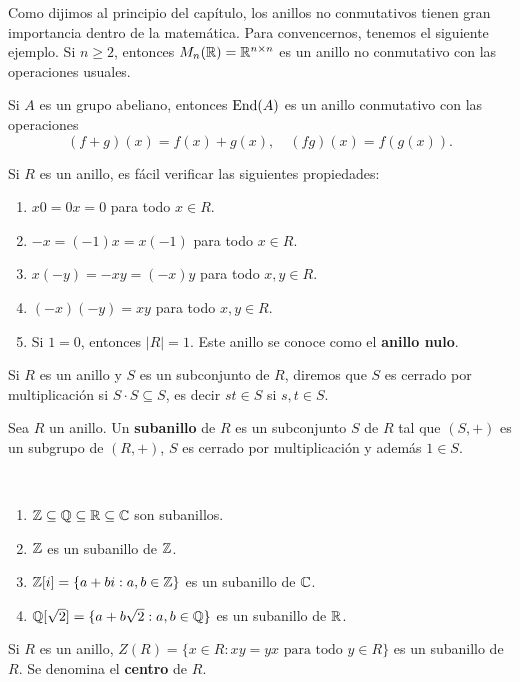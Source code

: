Como dijimos al principio del capítulo, los anillos no conmutativos tienen gran importancia dentro de la matemática. Para convencernos, 
tenemos el siguiente ejemplo. Si $n\geq2$, entonces 
$M_n(\mathbb{R})=\mathbb{R}^{n\times n}$ es un anillo no conmutativo con las operaciones usuales. 

\begin{exercise}
Si $A$ es un grupo abeliano, entonces $\operatorname{End}(A)$ es un anillo conmutativo con 
las operaciones
\[
(f+g)(x)=f(x)+g(x),\quad
(fg)(x)=f(g(x)).
\]	
\end{exercise}

Si $R$ es un anillo, es fácil verificar las siguientes propiedades:
\begin{enumerate}
	\item $x0=0x=0$ para todo $x\in R$.
	\item $-x=(-1)x=x(-1)$ para todo $x\in R$.
	\item $x(-y)=-xy=(-x)y$ para todo $x,y\in R$.
	\item $(-x)(-y)=xy$ para todo $x,y\in R$.
	\item Si $1=0$, entonces $|R|=1$. Este anillo se conoce como el \textbf{anillo nulo}.
\end{enumerate}

Si $R$ es un anillo y $S$ es un subconjunto de $R$, diremos que 
$S$ es cerrado por multiplicación si $S\cdot S\subseteq S$, 
es decir $st\in S$ si $s,t\in S$. 

\begin{definition}
Sea $R$ un anillo. 
Un \textbf{subanillo} de $R$ es un subconjunto $S$ de $R$ tal que $(S,+)$ es un subgrupo de $(R,+)$, $S$ es cerrado por multiplicación y además $1\in S$. 
\end{definition}

\begin{examples}\
\begin{enumerate}
\item $\mathbb{Z}\subseteq \mathbb{Q}\subseteq\mathbb{R}\subseteq\mathbb{C}$ son subanillos. 
\item $\mathbb{Z}$ es un subanillo de $\mathbb{Z}$.
\item $\mathbb{Z}[i]=\{a+bi:a,b\in\mathbb{Z}\}$ es un subanillo de $\mathbb{C}$. 
\item $\mathbb{Q}[\sqrt{2}]=\{a+b\sqrt{2}:a,b\in\mathbb{Q}\}$ es un subanillo de $\mathbb{R}$.
\end{enumerate}
\end{examples}

\begin{example}
Si $R$ es un anillo, $Z(R)=\{x\in R:xy=yx\text{ para todo $y\in R$}\}$ es un subanillo de $R$. Se denomina el \textbf{centro} de $R$.
\end{example}

